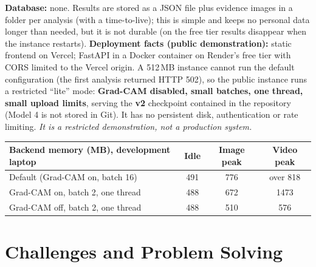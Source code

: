 \documentclass[11pt,a4paper]{report}
\begin{document}
\textbf{Database:} none. Results are stored as a JSON file plus evidence images in a folder per analysis (with a time-to-live); this is simple and keeps no personal data longer than needed, but it is not durable (on the free tier results disappear when the instance restarts).
\textbf{Deployment facts (public demonstration):} static frontend on Vercel; FastAPI in a Docker container on Render's free tier with CORS limited to the Vercel origin. A 512\,MB instance cannot run the default configuration (the first analysis returned HTTP 502), so the public instance runs a restricted ``lite'' mode: \textbf{Grad-CAM disabled, small batches, one thread, small upload limits}, serving the \textbf{v2} checkpoint contained in the repository (Model 4 is not stored in Git). It has no persistent disk, authentication or rate limiting. \emph{It is a restricted demonstration, not a production system.}

\begin{center}
\small
\begin{tabular}{|l|c|c|c|}
\hline
\textbf{Backend memory (MB), development laptop} & \textbf{Idle} & \textbf{Image peak} & \textbf{Video peak}\\\hline
Default (Grad-CAM on, batch 16) & 491 & 776 & over 818\\\hline
Grad-CAM on, batch 2, one thread & 488 & 672 & 1473\\\hline
Grad-CAM off, batch 2, one thread & 488 & 510 & 576\\\hline
\end{tabular}
\end{center}

\chapter{Challenges and Problem Solving}
\end{document}
